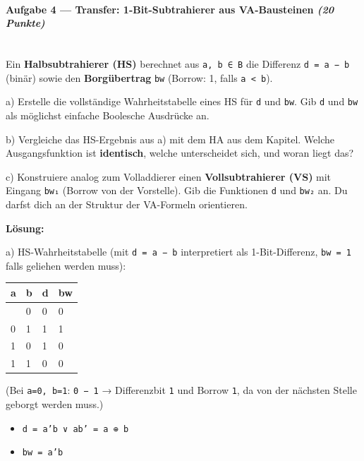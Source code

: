 \documentclass[11pt, a4paper]{article}
\begin{document}
\paragraph{Aufgabe 4 — Transfer: 1-Bit-Subtrahierer aus VA-Bausteinen \textit{(20 Punkte)}}\mbox{}\\[2pt]

Ein \textbf{Halbsubtrahierer (HS)} berechnet aus \texttt{a, b ∈ B} die Differenz \texttt{d = a − b} (binär) sowie den \textbf{Borgübertrag} \texttt{bw} (Borrow: 1, falls \texttt{a < b}).


a) Erstelle die vollständige Wahrheitstabelle eines HS für \texttt{d} und \texttt{bw}. Gib \texttt{d} und \texttt{bw} als möglichst einfache Boolesche Ausdrücke an.


b) Vergleiche das HS-Ergebnis aus a) mit dem HA aus dem Kapitel. Welche Ausgangsfunktion ist \textbf{identisch}, welche unterscheidet sich, und woran liegt das?


c) Konstruiere analog zum Volladdierer einen \textbf{Vollsubtrahierer (VS)} mit Eingang \texttt{bw₁} (Borrow von der Vorstelle). Gib die Funktionen \texttt{d} und \texttt{bw₂} an. Du darfst dich an der Struktur der VA-Formeln orientieren.


\textbf{Lösung:}


a) HS-Wahrheitstabelle (mit \texttt{d = a − b} interpretiert als 1-Bit-Differenz, \texttt{bw = 1} falls geliehen werden muss):



{\small
\begin{tabularx}{\linewidth}{XXXX}
\hline
\rowcolor{tableheadbg}
{\color{white}\textbf{a}} & {\color{white}\textbf{b}} & {\color{white}\textbf{d}} & {\color{white}\textbf{bw}} \\[2pt]
\hline
\endhead
\hline
\endfoot
0 & 0 & 0 & 0 \\
0 & 1 & 1 & 1 \\
1 & 0 & 1 & 0 \\
1 & 1 & 0 & 0 \\
\end{tabularx}
}


(Bei \texttt{a=0, b=1}: \texttt{0 − 1} → Differenzbit \texttt{1} und Borrow \texttt{1}, da von der nächsten Stelle geborgt werden muss.)


\begin{itemize}
  \item \texttt{d = a'b ∨ ab' = a ⊕ b}
  \item \texttt{bw = a'b}
\end{itemize}
\end{document}
